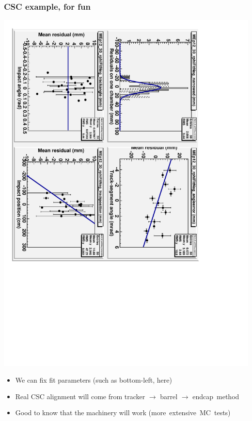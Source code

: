 \documentclass[compress]{beamer}
\begin{document}
\begin{frame}
\frametitle{CSC example, for fun}
\includegraphics[height=0.7\linewidth, angle=90]{example_CSC.pdf}

\begin{itemize}
\item We can fix fit parameters (such as bottom-left, here)
\item Real CSC alignment will come from tracker $\to$ barrel $\to$ \mbox{endcap method\hspace{-1 cm}}
\item Good to know that the machinery will work \mbox{(more extensive MC tests)\hspace{-1 cm}}
\end{itemize}
\end{frame}
\end{document}

